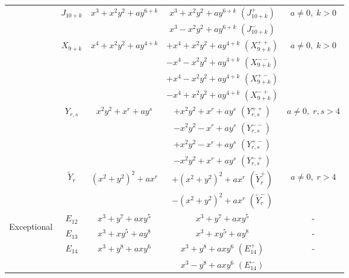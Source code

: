 \documentclass[noend]{amsproc}
\theoremstyle{definition}
\newcommand{\tY}{\widetilde{Y}}
\begin{document}
\begin{table}[tp]
\begin{tabular}{|c|c|c|c|c|}
& \multirow{2}{*}{$J_{10+k}$} & \multirow{2}{*}{$x^3+x^2y^2+ay^{6+k}$}
  & $x^3+x^2y^2+ay^{6+k}$ $(J_{10+k}^+)$
      & \multirow{2}{*}{$a \neq 0,\; k > 0$} \\ \cline{4-4}
&&& $x^3-x^2y^2+ay^{6+k}$ $(J_{10+k}^-)$ &   \\ \cline{2-5}

& \multirow{4}{*}{$X_{9+k}$} & \multirow{4}{*}{$x^4+x^2y^2+ay^{4+k}$}
  & $+x^4+x^2y^2+ay^{4+k}$ $(X_{9+k}^{++})$
      & \multirow{4}{*}{$a \neq 0,\; k > 0$}  \\ \cline{4-4}
&&& $-x^4-x^2y^2+ay^{4+k}$ $(X_{9+k}^{--})$ & \\ \cline{4-4}
&&& $+x^4-x^2y^2+ay^{4+k}$ $(X_{9+k}^{+-})$ & \\ \cline{4-4}
&&& $-x^4+x^2y^2+ay^{4+k}$ $(X_{9+k}^{-+})$ & \\ \cline{2-5}

& \multirow{4}{*}{$Y_{r,s}$} & \multirow{4}{*}{$x^2y^2+x^r+ay^s$}
  & $+x^2y^2+x^r+ay^s$ $(Y_{r,s}^{++})$
      & \multirow{4}{*}{$a \neq 0,\; r,s > 4$} \\ \cline{4-4}
&&& $-x^2y^2-x^r+ay^s$ $(Y_{r,s}^{--})$ &      \\ \cline{4-4}
&&& $+x^2y^2-x^r+ay^s$ $(Y_{r,s}^{+-})$ &      \\ \cline{4-4}
&&& $-x^2y^2+x^r+ay^s$ $(Y_{r,s}^{-+})$ &      \\ \cline{2-5}

& \multirow{2}{*}{$\tY_r$} & \multirow{2}{*}{$(x^2+y^2)^2+ax^r$}
  & $+(x^2+y^2)^2+ax^r$ $(\tY_r^+)$
      & \multirow{2}{*}{$a \neq 0,\; r > 4$} \\ \cline{4-4}
&&& $-(x^2+y^2)^2+ax^r$ $(\tY_r^-)$ &        \\ \hline


\multirow{12}{*}{\begin{sideways}Exceptional\end{sideways}}

& $E_{12}$ & $x^3+y^7+axy^5$ & $x^3+y^7+axy^5$ & - \\ \cline{2-5}

& $E_{13}$ & $x^3+xy^5+ay^8$ & $x^3+xy^5+ay^8$ & - \\ \cline{2-5}

& \multirow{2}{*}{$E_{14}$} & \multirow{2}{*}{$x^3+y^8+axy^6$}
  & $x^3+y^8+axy^6$ $(E_{14}^+)$ & \multirow{2}{*}{-} \\ \cline{4-4}
&&& $x^3-y^8+axy^6$ $(E_{14}^-)$ &                    \\ \cline{2-5}


\end{tabular}
\end{table}
\end{document}
